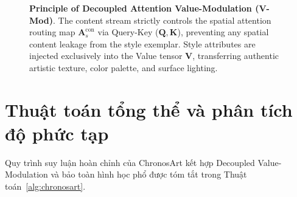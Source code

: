 \documentclass[10pt,twocolumn,letterpaper]{article}
\begin{document}
\begin{figure}[t]
\caption{\textbf{Principle of Decoupled Attention Value-Modulation (V-Mod)}. The content stream strictly controls the spatial attention routing map $\mathbf{A}_s^{\text{con}}$ via Query-Key ($\mathbf{Q}, \mathbf{K}$), preventing any spatial content leakage from the style exemplar. Style attributes are injected exclusively into the Value tensor $\mathbf{V}$, transferring authentic artistic texture, color palette, and surface lighting.}
\label{fig:tikz_proposal}
\end{figure}

\section{Thuật toán tổng thể và phân tích độ phức tạp}
\label{sec:algo}

Quy trình suy luận hoàn chỉnh của ChronosArt kết hợp Decoupled Value-Modulation và bảo toàn hình học phổ được tóm tắt trong Thuật toán~\ref{alg:chronosart}.
\end{document}
